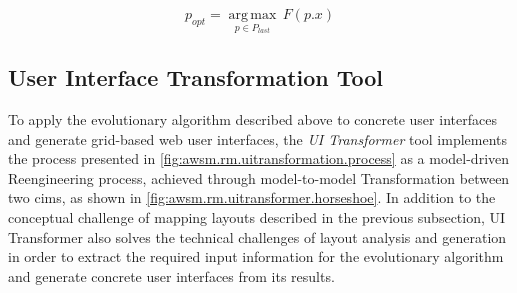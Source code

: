 \begin{equation}p_{opt} = \underset{p \in P_{last}}{\operatorname{arg\,max}}\, F(p.x)\label{eq:final-selection}\end{equation}

\vspace{-10pt}
\hypertarget{sec:uitransformation.tool}{%
\subsection{User Interface Transformation Tool}\label{sec:uitransformation.tool}}
\vspace{10pt}

To apply the evolutionary algorithm described above to concrete  user interfaces and generate grid-based \gls{web} user interfaces, the \emph{UI Transformer} tool implements the process presented in \cref{fig:awsm.rm.uitransformation.process} as a model-driven \gls{Reengineering} process, achieved through model-to-model \gls{Transformation} between two \glspl{cim}, as shown in \cref{fig:awsm.rm.uitransformer.horseshoe}.
In addition to the conceptual challenge of mapping layouts described in the previous subsection, UI Transformer also solves the technical challenges of layout analysis and generation in order to extract the required input information for the evolutionary algorithm and generate concrete user interfaces from its results.

